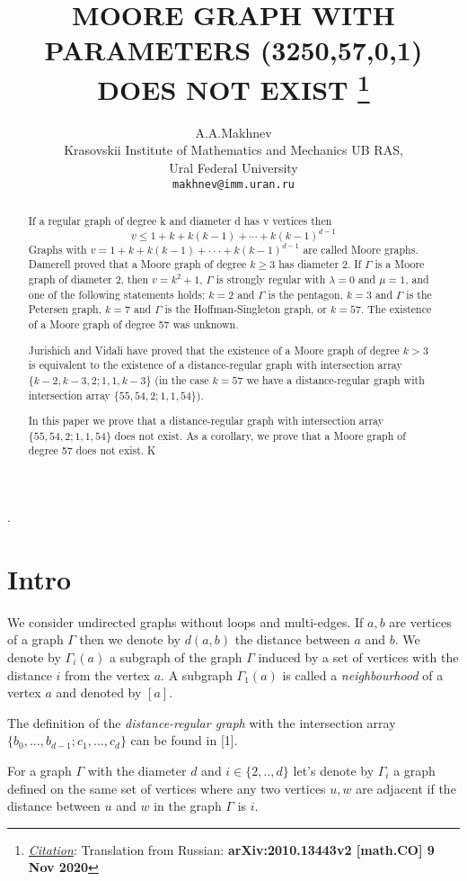 \documentclass{article}
\title{MOORE GRAPH WITH PARAMETERS (3250,57,0,1) DOES NOT EXIST
\thanks{\textit{\underline{Citation}}: Translation from Russian:
\textbf{arXiv:2010.13443v2 [math.CO] 9 Nov 2020}}
}
\author{
    A.A.Makhnev \\
    Krasovskii Institute of Mathematics and Mechanics UB RAS, \\
    Ural Federal University \\
    \texttt{makhnev@imm.uran.ru} \\
}
\theoremstyle{definition}
\theoremstyle{definition}
\theoremstyle{remark}
\begin{document}
\maketitle

\begin{abstract}
If a regular graph of degree k and diameter d has v vertices then
\[ v \le 1 + k + k(k - 1) + \cdots + k(k - 1)^{d - 1} \]
Graphs with $v = 1 + k + k(k - 1) + · · · + k(k - 1)^{d-1}$ are called Moore graphs. Damerell proved that a Moore graph of degree $k \ge 3$ has diameter $2$. If $\Gamma$ is a Moore graph of diameter $2$, then $v = k^2 + 1$, $\Gamma$ is strongly regular with $\lambda = 0$ and $\mu = 1$, and one of the following statements holds: $k = 2$ and $\Gamma$ is the pentagon, $k = 3$ and $\Gamma$ is the Petersen graph, $k = 7$ and $\Gamma$ is the Hoffman-Singleton graph, or $k = 57$. The existence of a Moore graph of degree 57 was unknown.

Jurishich and Vidali have proved that the existence of a Moore graph of degree $k > 3$ is equivalent to the existence of a distance-regular graph with intersection array $\{k - 2, k - 3, 2; 1, 1, k - 3\}$ (in the case $k = 57$ we have a distance-regular graph with intersection array $\{55, 54, 2; 1, 1, 54\}$).

In this paper we prove that a distance-regular graph with intersection array $\{55, 54, 2; 1, 1, 54\}$ does not exist. As a corollary, we prove that a Moore graph of degree 57 does not exist.
K

\end{abstract}

.

\section{Intro}

We consider undirected graphs without loops and multi-edges. If $a,b$ are vertices of a graph $\Gamma$ then we denote by $d(a,b)$ the distance between $a$ and $b$. We denote by $\Gamma_i(a)$ a subgraph of the graph $\Gamma$ induced by a set of vertices with the distance $i$ from the vertex $a$. A subgraph $\Gamma_1(a)$ is called a {\it neighbourhood} of a vertex $a$ and denoted by $[a]$.

The definition of the {\it distance-regular graph} with the intersection array $\{b_0, ..., b_{d-1}; c_1, ..., c_d \}$ can be found in [1].

For a graph $\Gamma$ with the diameter $d$ and $i \in \{2,..,d\}$ let's denote by $\Gamma_i$ a graph defined on the same set of vertices where any two vertices $u,w$ are adjacent if the distance between $u$ and $w$ in the graph $\Gamma$ is $i$.
\end{document}
